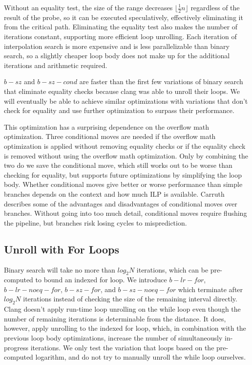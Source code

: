 \documentclass[twocolumn]{article}
\begin{document}
Without an equality test, the size of the range decreases $\lfloor \frac{1}{2}n \rfloor$ regardless of the result of the probe, so it can be executed speculatively, effectively eliminating it from the critical path. Eliminating the equality test also makes the number of iterations constant, supporting more efficient loop unrolling. Each iteration of interpolation search is more expensive and is less parallelizable than binary search, so a slightly cheaper loop body does not make up for the additional iterations and arithmetic required.

$b-sz$ and $b-sz-cond$ are faster than the first few variations of binary search that eliminate equality checks because clang was able to unroll their loops. We will eventually be able to achieve similar optimizations with variations that don't check for equality and use further optimization to surpass their performance.

This optimization has a surprising dependence on the overflow math optimization. Three conditional moves are needed if the overflow math optimization is applied without removing equality checks or if the equality check is removed without using the overflow math optimization. Only by combining the two do we save the conditional move, which still works out to be worse than checking for equality, but supports future optimizations by simplifying the loop body. Whether conditional moves give better or worse performance than simple branches depends on the context and how much ILP is available. Carruth \cite{carruth} describes some of the advantages and disadvantages of conditional moves over branches. Without going into too much detail, conditional moves require flushing the pipeline, but branches risk losing cycles to misprediction.

\subsection{Unroll with For Loops}
\label{for}
Binary search will take no more than $log_2 N$ iterations, which can be pre-computed to bound an indexed for loop. We introduce $b-lr-for$, $b-lr-noeq-for$, $b-sz-for$, and $b-sz-noeq-for$ which terminate after $log_2 N$ iterations instead of checking the size of the remaining interval directly. Clang doesn't apply run-time loop unrolling on the while loop even though the number of remaining iterations is determinable from the distance. It does, however, apply unrolling to the indexed for loop, which, in combination with the previous loop body optimizations, increase the number of simultaneously in-progress iterations. We only test the variation that loops based on the pre-computed logarithm, and do not try to manually unroll the while loop ourselves.
\end{document}
